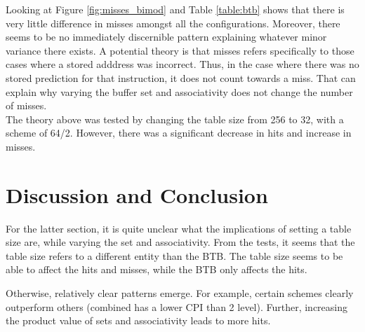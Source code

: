 \documentclass[twocolumn]{article}
\begin{document}
Looking at Figure \ref{fig:misses_bimod} and Table \ref{table:btb} shows that there is very little difference in misses amongst all the configurations. Moreover, there seems to be no immediately discernible pattern explaining whatever minor variance there exists. A potential theory is that misses refers specifically to those cases where a stored adddress was incorrect. Thus, in the case where there was no stored prediction for that instruction, it does not count towards a miss. That can explain why varying the buffer set and associativity does not change the number of misses.\\

The theory above was tested by changing the table size from 256 to 32, with a scheme of 64/2. However, there was a significant decrease in hits and increase in misses. \\

\section{Discussion and Conclusion}

For the latter section, it is quite unclear what the implications of setting a table size are, while varying the set and associativity. From the tests, it seems that the table size refers to a different entity than the BTB. The table size seems to be able to affect the hits and misses, while the BTB only affects the hits. 

Otherwise, relatively clear patterns emerge. For example, certain schemes clearly outperform others (combined has a lower CPI than 2 level). Further, increasing the product value of sets and associativity leads to more hits. 










\printbibliography
\end{document}
